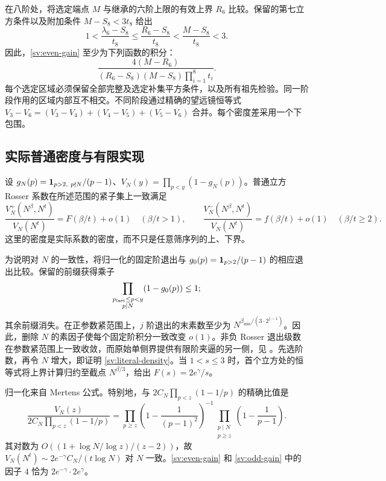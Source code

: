 在八阶处，将选定端点 $M$ 与继承的六阶上限的有效上界 $R_6$ 比较。保留的第七立方条件以及附加条件 $M-S_8<3t_8$ 给出
\begin{equation}\label{sv:eighth-range}
 1<\frac{\lambda_6-S_8}{t_8}
 \le\frac{R_6-S_8}{t_8}<\frac{M-S_8}{t_8}<3.
\end{equation}
因此，\eqref{sv:even-gain} 至少为下列函数的积分：
\begin{equation}\label{sv:eighth-density}
 \frac{4(M-R_6)}{(R_6-S_8)(M-S_8)\prod_{i=1}^8t_i}.
\end{equation}
每个选定区域必须保留全部完整及选定补集平方条件，以及所有祖先检验。同一阶段作用的区域内部互不相交。不同阶段通过精确的望远镜恒等式 $V_3-V_6=(V_3-V_4)+(V_4-V_5)+(V_5-V_6)$ 合并。每个密度差采用一个下包围。

\subsection{实际普通密度与有限实现}

设 $g_N(p)=\mathbf 1_{p>2,\ p\nmid N}/(p-1)$、$V_N(y)=\prod_{p<y}(1-g_N(p))$。普通立方 Rosser 系数在所述范围的紧子集上一致满足
\begin{equation}\label{sv:literal-density}
 \frac{V_N^+(N^\beta,N^t)}{V_N(N^t)}=F(\beta/t)+o(1)
       \quad(\beta/t>1),\qquad
 \frac{V_N^-(N^\beta,N^t)}{V_N(N^t)}=f(\beta/t)+o(1)
       \quad(\beta/t\ge2).
\end{equation}
这里的密度是实际系数的密度，而不只是任意筛序列的上、下界。

为说明对 $N$ 的一致性，将归一化的固定阶退出与 $g_0(p)=\mathbf 1_{p>2}/(p-1)$ 的相应退出比较。保留的前缀获得乘子
\[
 \prod_{\substack{p_{\rm last}\le p<y\\p\mid N}}(1-g_0(p))\le1;
\]
其余前缀消失。在正参数紧范围上，$j$ 阶退出的末素数至少为 $N^{\beta_{\min}/(3\cdot2^{j-1})}$。因此，删除 $N$ 的素因子使每个固定阶积分一致改变 $o(1)$。非负 Rosser 退出级数在参数紧范围上一致收敛，而原始单侧界提供有限阶夹逼的另一侧，见 \cite[命题~11.8 及 引理~14.7]{Suzuki}。先选阶数，再令 $N$ 增大，即证明 \eqref{sv:literal-density}。当 $1<s\le3$ 时，首个立方处的恒等式将上界计算归约至截点 $N^{\beta/3}$，给出 $F(s)=2e^\gamma/s$。

归一化来自 Mertens 公式。特别地，与 $2C_N\prod_{p<z}(1-1/p)$ 的精确比值是
\begin{equation}\label{sv:euler-ratio}
 \frac{V_N(z)}{2C_N\prod_{p<z}(1-1/p)}
 =\prod_{p\ge z}\left(1-\frac1{(p-1)^2}\right)^{-1}
  \prod_{\substack{p\mid N\\p\ge z}}\left(1-\frac1{p-1}\right).
\end{equation}
其对数为 $O((1+\log N/\log z)/(z-2))$，故 $V_N(N^t)\sim2e^{-\gamma}C_N/(t\log N)$ 对 $N$ 一致。\eqref{sv:even-gain} 和 \eqref{sv:odd-gain} 中的因子 $4$ 恰为 $2e^{-\gamma}\cdot2e^\gamma$。

